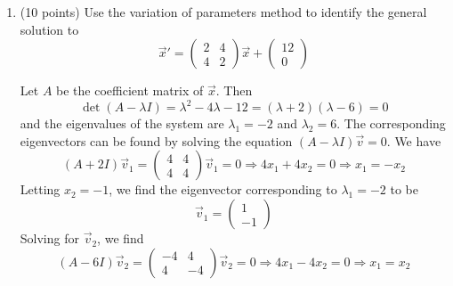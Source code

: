 \documentclass[11pt, titlepage]{article}
\begin{document}
\begin{enumerate}
        \item (10 points) Use the variation of parameters method to identify the
            general solution to
            \[
                \vec{x}' = 
                \begin{pmatrix}
                    2 & 4 \\
                    4 & 2
                \end{pmatrix} \vec{x} +
                \begin{pmatrix}
                    12 \\
                    0
                \end{pmatrix}
            \]
            \begin{solution}
                Let $A$ be the coefficient matrix of $\vec{x}$. Then
                \[
                    \det(A - \lambda I) = \lambda^2 - 4\lambda - 12 = (\lambda +
                    2) (\lambda - 6) = 0
                \] 
                and the eigenvalues of the system are $\lambda_1 = -2$ and
                $\lambda_2 = 6$. The corresponding eigenvectors can be found by
                solving the equation $(A - \lambda I) \vec{v} = 0$. We have
                \[
                    (A + 2I) \vec{v}_1 =
                    \begin{pmatrix}
                        4 & 4 \\
                        4 & 4
                    \end{pmatrix} \vec{v}_1 = 0 \Longrightarrow
                    4x_1 + 4x_2 = 0 \Longrightarrow
                    x_1 = -x_2
                \] 
                Letting $x_2 = -1$, we find the eigenvector corresponding to
                $\lambda_1 = -2$ to be
                \[
                    \vec{v}_1 =
                    \begin{pmatrix}
                        1 \\
                        -1
                    \end{pmatrix}
                \] 
                Solving for $\vec{v}_2$, we find
                \[
                    (A - 6I) \vec{v}_2 = 
                    \begin{pmatrix}
                        -4 & 4 \\
                        4 & -4
                    \end{pmatrix} \vec{v}_2 = 0 \Longrightarrow
                    4x_1 - 4x_2 = 0 \Longrightarrow
                    x_1 = x_2
                \] 

\end{solution}
\end{enumerate}
\end{document}
